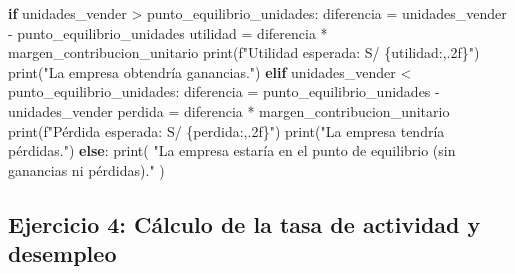 \documentclass[
  doc,
  floatsintext,
  longtable,
  a4paper,
  nolmodern,
  notxfonts,
  notimes,
  12pt,
  colorlinks=true,linkcolor=blue,citecolor=blue,urlcolor=blue]{apa7}
\newenvironment{Shaded}{\begin{snugshade}}{\end{snugshade}}
\newcommand{\BuiltInTok}[1]{\textcolor[rgb]{0.00,0.23,0.31}{#1}}
\newcommand{\ControlFlowTok}[1]{\textcolor[rgb]{0.00,0.23,0.31}{\textbf{#1}}}
\newcommand{\NormalTok}[1]{\textcolor[rgb]{0.00,0.23,0.31}{#1}}
\newcommand{\OperatorTok}[1]{\textcolor[rgb]{0.37,0.37,0.37}{#1}}
\newcommand{\SpecialCharTok}[1]{\textcolor[rgb]{0.37,0.37,0.37}{#1}}
\newcommand{\SpecialStringTok}[1]{\textcolor[rgb]{0.13,0.47,0.30}{#1}}
\newcommand{\StringTok}[1]{\textcolor[rgb]{0.13,0.47,0.30}{#1}}
\begin{document}
\begin{Shaded}
\begin{Highlighting}[]
    \ControlFlowTok{if}\NormalTok{ unidades\_vender }\OperatorTok{\textgreater{}}\NormalTok{ punto\_equilibrio\_unidades:}
\NormalTok{        diferencia }\OperatorTok{=}\NormalTok{ unidades\_vender }\OperatorTok{{-}}\NormalTok{ punto\_equilibrio\_unidades}
\NormalTok{        utilidad }\OperatorTok{=}\NormalTok{ diferencia }\OperatorTok{*}\NormalTok{ margen\_contribucion\_unitario}
        \BuiltInTok{print}\NormalTok{(}\SpecialStringTok{f"Utilidad esperada: S/ }\SpecialCharTok{\{}\NormalTok{utilidad}\SpecialCharTok{:,.2f\}}\SpecialStringTok{"}\NormalTok{)}
        \BuiltInTok{print}\NormalTok{(}\StringTok{"La empresa obtendría ganancias."}\NormalTok{)}
    \ControlFlowTok{elif}\NormalTok{ unidades\_vender }\OperatorTok{\textless{}}\NormalTok{ punto\_equilibrio\_unidades:}
\NormalTok{        diferencia }\OperatorTok{=}\NormalTok{ punto\_equilibrio\_unidades }\OperatorTok{{-}}\NormalTok{ unidades\_vender}
\NormalTok{        perdida }\OperatorTok{=}\NormalTok{ diferencia }\OperatorTok{*}\NormalTok{ margen\_contribucion\_unitario}
        \BuiltInTok{print}\NormalTok{(}\SpecialStringTok{f"Pérdida esperada: S/ }\SpecialCharTok{\{}\NormalTok{perdida}\SpecialCharTok{:,.2f\}}\SpecialStringTok{"}\NormalTok{)}
        \BuiltInTok{print}\NormalTok{(}\StringTok{"La empresa tendría pérdidas."}\NormalTok{)}
    \ControlFlowTok{else}\NormalTok{:}
        \BuiltInTok{print}\NormalTok{(}
            \StringTok{"La empresa estaría en el punto de equilibrio (sin ganancias ni pérdidas)."}
\NormalTok{        )}
\end{Highlighting}
\end{Shaded}

\subsection{Ejercicio 4: Cálculo de la tasa de actividad y
desempleo}\label{ejercicio-4-cuxe1lculo-de-la-tasa-de-actividad-y-desempleo}
\end{document}
